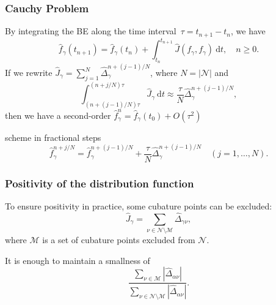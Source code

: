 \documentclass[mathserif]{beamer} %
\newcommand{\dd}{\:\mathrm{d}}
\newcommand{\Nu}{\mathcal{N}}
\newcommand{\OO}[1]{O(#1)}
\begin{document}
\begin{frame}
    \frametitle{Cauchy Problem}
    By integrating the BE along the time interval~\(\tau = t_{n+1} - t_n\), we have
    \begin{equation}\label{eq:time_scheme}
        \hat{f}_\gamma(t_{n+1}) = \hat{f}_\gamma(t_n) + \int_{t_n}^{t_{n+1}} \hat{J}(f_\gamma, f_\gamma) \dd{t},
        \quad n\ge0.
    \end{equation}
    If we rewrite \(\hat{J}_{\gamma} = \sum_{j=1}^N \hat{\Delta}_{\gamma}^{n+(j-1)/N}\), where \(N=|\Nu|\) and
    \begin{equation}\label{eq:discrete_short_ci}
        \int_{(n+(j-1)/N)\tau}^{(n+j/N)\tau}\hat{J}_\gamma\dd{t} \approx
            \frac{\tau}{N} \hat{\Delta}_{\gamma}^{n+(j-1)/N},
    \end{equation}
    \pause
    then we have a second-order \(\hat{f}_\gamma^n = \hat{f}_\gamma(t_0) + \OO{\tau^2}\)
    \begin{block}{scheme in fractional steps}
        \vspace{-5pt}
        \begin{equation}\label{eq:fractional_step_scheme}
            \hat{f}_\gamma^{n+j/N} = \hat{f}_\gamma^{n+(j-1)/N} + \frac{\tau}{N}\hat{\Delta}_{\gamma}^{n+(j-1)/N}
            \quad (j = 1,\dotsc,N).
        \end{equation}
        \vspace{-10pt}
    \end{block}
\end{frame}

\begin{frame}
    \frametitle{Positivity of the distribution function}
    To ensure positivity in practice, some cubature points can be excluded:
    \begin{equation}\label{eq:discrete_short_ci_discarded}
        \hat{J}_\gamma = \sum_{\nu\in\Nu\setminus\mathcal{M}} \hat{\Delta}_{\gamma\nu},
    \end{equation}
    where \(\mathcal{M}\) is a set of cubature points excluded from \(\Nu\).
    \vspace{20pt}\pause

    It is enough to maintain a smallness of
    \begin{equation}\label{eq:excluded_contribution}
        \frac{\sum_{\nu\in\mathcal{M}} \left| \hat{\Delta}_{\alpha\nu} \right|}
            {\sum_{\nu\in\Nu\setminus\mathcal{M}} \left| \hat{\Delta}_{\alpha\nu} \right|}.
    \end{equation}
\end{frame}
\end{document}
